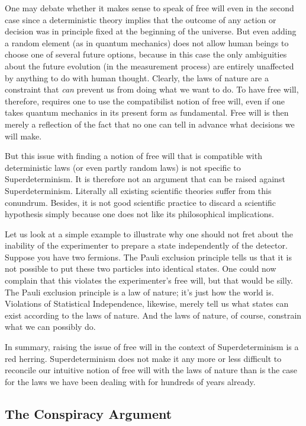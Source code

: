 \documentclass[12pt]{article}
\begin{document}
One may debate whether it makes sense to speak of free will even in the second case since a deterministic theory implies that the outcome of any action or decision was in principle fixed at the beginning of the universe. But even adding a random element (as in quantum mechanics) does not allow human beings to choose one of several future options, because in this case the only ambiguities about the future evolution (in the measurement process) are entirely unaffected by anything to do with human thought. Clearly, the laws of nature are a constraint that \emph{can} prevent us from doing what we want to do. To have free will, therefore, requires one to use the compatibilist notion of free will, even if one takes quantum mechanics in its present form as fundamental. Free will is then merely a reflection of the fact that no one can tell in advance what decisions we will make. 

But this issue with finding a notion of free will that is compatible with deterministic laws (or even partly random laws) is not specific to Superdeterminism. It is therefore not an argument that can be raised against Superdeterminism. Literally all existing scientific theories suffer from this conundrum. Besides, it is not good scientific practice to discard a scientific hypothesis simply because one does not like its philosophical implications.

Let us look at a simple example to illustrate why one should not fret about the inability of the experimenter to prepare a state independently of the detector. Suppose you have two fermions. The Pauli exclusion principle tells us that it is not possible to put these two particles into identical states. One could now complain that this violates the experimenter's free will, but that would be silly. The Pauli exclusion principle is a law of nature; it's just how the world is. Violations of Statistical Independence, likewise, merely tell us what states can exist according to the laws of nature. And the laws of nature, of course, constrain what we can possibly do. 

In summary, raising the issue of free will in the context of Superdeterminism is a red herring.  Superdeterminism does not make it any more or less difficult to reconcile our intuitive notion of free will with the laws of nature than is the case for the laws we have been dealing with for hundreds of years already.

\subsection{The Conspiracy Argument}
\label{cons}
\end{document}
